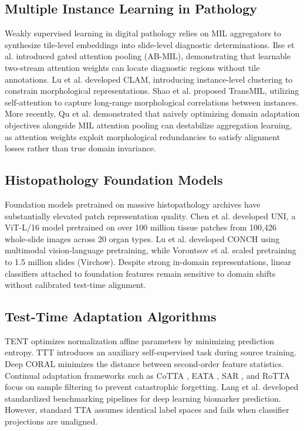 \documentclass[conference]{IEEEtran}
\begin{document}
\subsection{Multiple Instance Learning in Pathology}
Weakly supervised learning in digital pathology relies on MIL aggregators to synthesize tile-level embeddings into slide-level diagnostic determinations. Ilse et al. \cite{ilse2018attention} introduced gated attention pooling (AB-MIL), demonstrating that learnable two-stream attention weights can locate diagnostic regions without tile annotations. Lu et al. \cite{lu2021data} developed CLAM, introducing instance-level clustering to constrain morphological representations. Shao et al. \cite{shao2021transmil} proposed TransMIL, utilizing self-attention to capture long-range morphological correlations between instances. More recently, Qu et al. \cite{qu2023adaptmil} demonstrated that naively optimizing domain adaptation objectives alongside MIL attention pooling can destabilize aggregation learning, as attention weights exploit morphological redundancies to satisfy alignment losses rather than true domain invariance.

\subsection{Histopathology Foundation Models}
Foundation models pretrained on massive histopathology archives have substantially elevated patch representation quality. Chen et al. \cite{chen2024uni} developed UNI, a ViT-L/16 model pretrained on over 100 million tissue patches from 100,426 whole-slide images across 20 organ types. Lu et al. \cite{lu2024conch} developed CONCH using multimodal vision-language pretraining, while Vorontsov et al. \cite{vorontsov2024virchow} scaled pretraining to 1.5 million slides (Virchow). Despite strong in-domain representations, linear classifiers attached to foundation features remain sensitive to domain shifts without calibrated test-time alignment.

\subsection{Test-Time Adaptation Algorithms}
TENT \cite{wang2021tent} optimizes normalization affine parameters by minimizing prediction entropy. TTT \cite{sun2020test} introduces an auxiliary self-supervised task during source training. Deep CORAL \cite{sun2016coral} minimizes the distance between second-order feature statistics. Continual adaptation frameworks such as CoTTA \cite{wang2022cotta}, EATA \cite{niu2022eata}, SAR \cite{niu2023towards}, and RoTTA \cite{yuan2023rotta} focus on sample filtering to prevent catastrophic forgetting. Lang et al. \cite{lang2023stamp} developed standardized benchmarking pipelines for deep learning biomarker prediction. However, standard TTA assumes identical label spaces and fails when classifier projections are unaligned.
\end{document}
